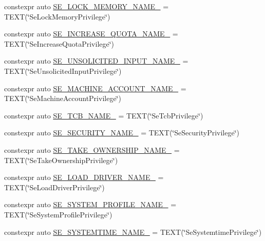 \begin{DoxyCompactItemize}
\item 
constexpr auto \mbox{\hyperlink{namespaceboost_1_1winapi_a6ad5ab72230b251b2b046322e78789cb}{S\+E\+\_\+\+L\+O\+C\+K\+\_\+\+M\+E\+M\+O\+R\+Y\+\_\+\+N\+A\+M\+E\+\_\+}} = T\+E\+XT(\char`\"{}Se\+Lock\+Memory\+Privilege\char`\"{})
\item 
constexpr auto \mbox{\hyperlink{namespaceboost_1_1winapi_ae2826f35eefd024e114dead76775929b}{S\+E\+\_\+\+I\+N\+C\+R\+E\+A\+S\+E\+\_\+\+Q\+U\+O\+T\+A\+\_\+\+N\+A\+M\+E\+\_\+}} = T\+E\+XT(\char`\"{}Se\+Increase\+Quota\+Privilege\char`\"{})
\item 
constexpr auto \mbox{\hyperlink{namespaceboost_1_1winapi_a3a8ca29f0aea4e05eb35ea2349e67d8b}{S\+E\+\_\+\+U\+N\+S\+O\+L\+I\+C\+I\+T\+E\+D\+\_\+\+I\+N\+P\+U\+T\+\_\+\+N\+A\+M\+E\+\_\+}} = T\+E\+XT(\char`\"{}Se\+Unsolicited\+Input\+Privilege\char`\"{})
\item 
constexpr auto \mbox{\hyperlink{namespaceboost_1_1winapi_a2b8e25b827283fdd46322e4798f66794}{S\+E\+\_\+\+M\+A\+C\+H\+I\+N\+E\+\_\+\+A\+C\+C\+O\+U\+N\+T\+\_\+\+N\+A\+M\+E\+\_\+}} = T\+E\+XT(\char`\"{}Se\+Machine\+Account\+Privilege\char`\"{})
\item 
constexpr auto \mbox{\hyperlink{namespaceboost_1_1winapi_a622a9fe6dc31d22b90f2c1d3312fb9a9}{S\+E\+\_\+\+T\+C\+B\+\_\+\+N\+A\+M\+E\+\_\+}} = T\+E\+XT(\char`\"{}Se\+Tcb\+Privilege\char`\"{})
\item 
constexpr auto \mbox{\hyperlink{namespaceboost_1_1winapi_a66576e5eeb9dfbd001e31860c79b6b4a}{S\+E\+\_\+\+S\+E\+C\+U\+R\+I\+T\+Y\+\_\+\+N\+A\+M\+E\+\_\+}} = T\+E\+XT(\char`\"{}Se\+Security\+Privilege\char`\"{})
\item 
constexpr auto \mbox{\hyperlink{namespaceboost_1_1winapi_a925c0b24f53e681487bb29ab033dabff}{S\+E\+\_\+\+T\+A\+K\+E\+\_\+\+O\+W\+N\+E\+R\+S\+H\+I\+P\+\_\+\+N\+A\+M\+E\+\_\+}} = T\+E\+XT(\char`\"{}Se\+Take\+Ownership\+Privilege\char`\"{})
\item 
constexpr auto \mbox{\hyperlink{namespaceboost_1_1winapi_a6717958568a079f5e3a9f1f6f23906b1}{S\+E\+\_\+\+L\+O\+A\+D\+\_\+\+D\+R\+I\+V\+E\+R\+\_\+\+N\+A\+M\+E\+\_\+}} = T\+E\+XT(\char`\"{}Se\+Load\+Driver\+Privilege\char`\"{})
\item 
constexpr auto \mbox{\hyperlink{namespaceboost_1_1winapi_ace7945d1525332019ae9feffb1fd5d59}{S\+E\+\_\+\+S\+Y\+S\+T\+E\+M\+\_\+\+P\+R\+O\+F\+I\+L\+E\+\_\+\+N\+A\+M\+E\+\_\+}} = T\+E\+XT(\char`\"{}Se\+System\+Profile\+Privilege\char`\"{})
\item 
constexpr auto \mbox{\hyperlink{namespaceboost_1_1winapi_aaa97b22aec5300085cbd3261e22eaf05}{S\+E\+\_\+\+S\+Y\+S\+T\+E\+M\+T\+I\+M\+E\+\_\+\+N\+A\+M\+E\+\_\+}} = T\+E\+XT(\char`\"{}Se\+Systemtime\+Privilege\char`\"{})

\end{DoxyCompactItemize}
